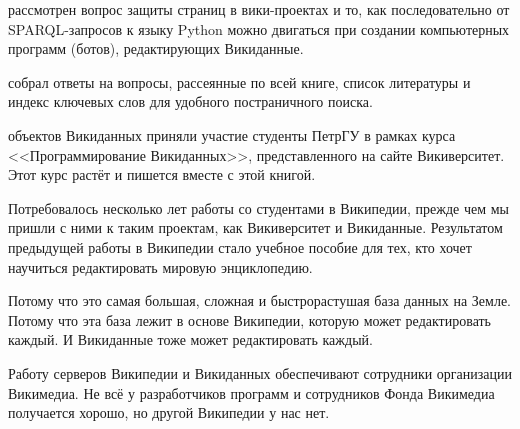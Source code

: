  рассмотрен вопрос защиты страниц в вики-проектах и то, как последовательно от SPARQL-запросов 
к языку Python можно двигаться при создании компьютерных программ (ботов), редактирующих Викиданные. 

собрал ответы на вопросы, рассеянные по всей книге, список литературы 
и индекс ключевых слов для удобного постраничного поиска.

 объектов Викиданных приняли участие студенты ПетрГУ в рамках курса <<Программирование Викиданных>>, 
представленного на сайте Викиверситет. 
Этот курс растёт и пишется вместе с этой книгой. 

Потребовалось несколько лет работы со студентами в Википедии, прежде чем мы пришли с ними к таким проектам, 
как Викиверситет и Викиданные. 
Результатом предыдущей работы в Википедии стало учебное пособие для тех, 
кто хочет научиться редактировать мировую энциклопедию\autocite{Krizhanovsky2015}.



Потому что это самая большая, сложная 
и быстрорастушая база данных на Земле. 
Потому что эта база лежит в основе Википедии, которую может редактировать каждый.
И Викиданные тоже может редактировать каждый. 

Работу серверов Википедии и Викиданных обеспечивают сотрудники организации Викимедиа. 
Не всё у разработчиков программ и сотрудников Фонда Викимедиа получается хорошо, 
но другой Википедии у нас нет.

